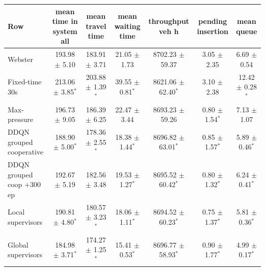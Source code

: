 \begin{tabular}{lcccccc}
\toprule
Row & mean time in system all & mean travel time & mean waiting time & throughput veh h & pending insertion & mean queue \\
\midrule
Webster & 193.98 $\pm$ 5.10 & 183.91 $\pm$ 3.71 & 21.05 $\pm$ 1.73 & 8702.23 $\pm$ 59.37 & 3.05 $\pm$ 2.35 & 6.69 $\pm$ 0.54 \\
Fixed-time 30s & 213.06 $\pm$ 3.85$^{*}$ & 203.88 $\pm$ 1.39$^{*}$ & 39.55 $\pm$ 0.81$^{*}$ & 8621.06 $\pm$ 62.40$^{*}$ & 3.10 $\pm$ 2.38 & 12.42 $\pm$ 0.28$^{*}$ \\
Max-pressure & 196.73 $\pm$ 9.05 & 186.39 $\pm$ 6.25 & 22.47 $\pm$ 3.44 & 8693.23 $\pm$ 59.26 & 0.80 $\pm$ 1.54$^{*}$ & 7.13 $\pm$ 1.07 \\
DDQN grouped cooperative & 188.90 $\pm$ 5.00$^{*}$ & 178.36 $\pm$ 2.55$^{*}$ & 18.38 $\pm$ 1.44$^{*}$ & 8696.82 $\pm$ 63.01$^{*}$ & 0.85 $\pm$ 1.57$^{*}$ & 5.89 $\pm$ 0.46$^{*}$ \\
DDQN grouped coop +300 ep & 192.67 $\pm$ 5.19 & 182.56 $\pm$ 3.48 & 19.53 $\pm$ 1.27$^{*}$ & 8695.52 $\pm$ 60.42$^{*}$ & 0.80 $\pm$ 1.32$^{*}$ & 6.24 $\pm$ 0.41$^{*}$ \\
Local supervisors & 190.81 $\pm$ 4.80$^{*}$ & 180.57 $\pm$ 3.23$^{*}$ & 18.06 $\pm$ 1.11$^{*}$ & 8694.52 $\pm$ 60.23$^{*}$ & 0.75 $\pm$ 1.37$^{*}$ & 5.81 $\pm$ 0.36$^{*}$ \\
Global supervisors & 184.98 $\pm$ 3.71$^{*}$ & 174.27 $\pm$ 1.25$^{*}$ & 15.41 $\pm$ 0.53$^{*}$ & 8696.77 $\pm$ 58.93$^{*}$ & 0.90 $\pm$ 1.77$^{*}$ & 4.99 $\pm$ 0.17$^{*}$ \\
\bottomrule
\end{tabular}

